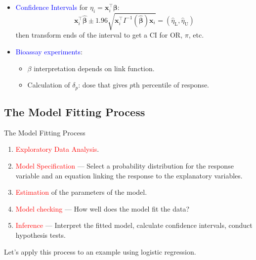 \documentclass[oneside]{book}\usepackage[]{graphicx}\usepackage[svgnames]{xcolor}
\providecommand{\Vector}[1]{\bm{#1}}%
\begin{document}
\begin{itemize}
      \item \textcolor{Blue}{Confidence Intervals} for $ \eta_i=\Vector{x}_i^\top \Vector{\beta} $:
            \[ \Vector{x}_i^\top \hat{\Vector{\beta}}\pm 1.96\sqrt{\Vector{x}_i^\top I^{-1}(\hat{\Vector{\beta}})\Vector{x}_i}=(\hat{\eta}_\text{L},\hat{\eta}_\text{U}) \]
            then transform ends of the interval to get a CI for OR, $ \pi $, etc.
      \item \textcolor{Blue}{Bioassay experiments}:
            \begin{itemize}
                  \item $ \beta $ interpretation depends on link function.
                  \item Calculation of $ \delta_p $: dose that gives $p$th percentile of response.
            \end{itemize}
\end{itemize}
\subsection*{The Model Fitting Process}
\begin{Regular}{The Model Fitting Process}
      \begin{enumerate}[start=0]
            \item \textcolor{red}{Exploratory Data Analysis}.
            \item \textcolor{red}{Model Specification} --- Select a probability distribution for the response variable
                  and an equation linking the response to the explanatory variables.
            \item \textcolor{red}{Estimation} of the parameters of the model.
            \item \textcolor{red}{Model checking} --- How well does the model fit the data?
            \item \textcolor{red}{Inference} --- Interpret the fitted model, calculate confidence intervals, conduct
                  hypothesis tests.
      \end{enumerate}
\end{Regular}
Let's apply this process to an example using logistic regression.
\end{document}
